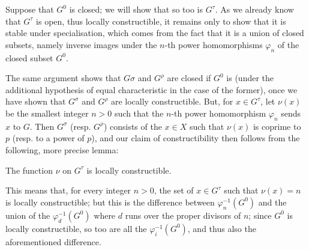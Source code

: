 Suppose that $G^0$ is closed;
we will show that so too is $G^\tau$.
As we already know that $G^\tau$ is open, thus locally constructible, it remains only to show that it is stable under specialisation, which comes from the fact that it is a union of closed subsets, namely inverse images under the $n$-th power homomorphisms $\varphi_n$ of the closed subset $G^0$.

The same argument shows that $G\sigma$ and $G^\rho$ are closed if $G^0$ is (under the additional hypothesis of equal characteristic in the case of the former), once we have shown that $G^\sigma$ and $G^\rho$ are locally constructible.
But, for $x\in G^\tau$, let $\nu(x)$ be the smallest integer $n>0$ such that the $n$-th power homomorphism $\varphi_n$ sends $x$ to $G$.
Then $G^\sigma$ (resp. $G^\rho$) consists of the $x\in X$ such that $\nu(x)$ is coprime to $p$ (resp. to a power of $p$), and our claim of constructibility then follows from the following, more precise lemma:

\begin{lemma}\label{fga3.vi-1-lemma-1.4}
    The function $\nu$ on $G^\tau$ is locally constructible.
\end{lemma}

\begin{cproof}
    This means that, for every integer $n>0$, the set of $x\in G^\tau$ such that $\nu(x)=n$ is locally constructible;
    but this is the difference between $\varphi_n^{-1}(G^0)$ and the union of the $\varphi_d^{-1}(G^0)$ where $d$ runs over the proper divisors of $n$;
    since $G^0$ is locally constructible, so too are all the $\varphi_i^{-1}(G^0)$, and thus also the aforementioned difference.
\end{cproof}

